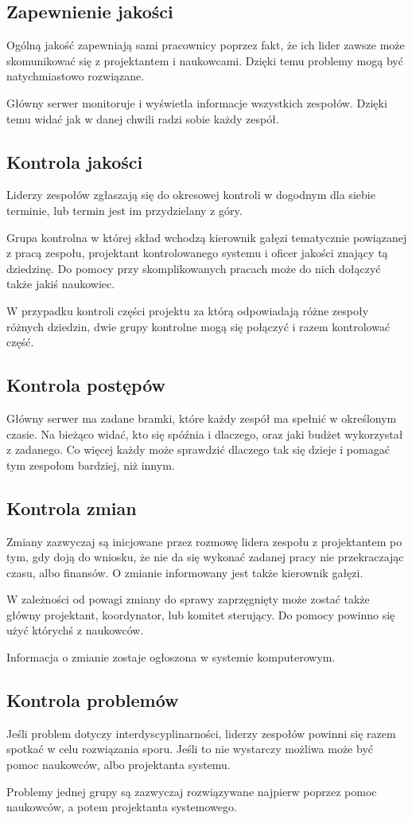 \subsection{Zapewnienie jakości}
Ogólną jakość zapewniają sami pracownicy poprzez fakt, że ich lider zawsze może skomunikować się z projektantem i naukowcami.
Dzięki temu problemy mogą być natychmiastowo rozwiązane.

Główny serwer monitoruje i wyświetla informacje wszystkich zespołów.
Dzięki temu widać jak w danej chwili radzi sobie każdy zespół.

\subsection{Kontrola jakości}
Liderzy zespołów zgłaszają się do okresowej kontroli w dogodnym dla siebie terminie, lub termin jest im przydzielany z góry.

Grupa kontrolna w której skład wchodzą kierownik gałęzi tematycznie powiązanej z pracą zespołu, projektant kontrolowanego systemu i oficer jakości znający tą dziedzinę.
Do pomocy przy skomplikowanych pracach może do nich dołączyć także jakiś naukowiec.

W przypadku kontroli części projektu za którą odpowiadają różne zespoły różnych dziedzin, dwie grupy kontrolne mogą się połączyć i razem kontrolować część.

\subsection{Kontrola postępów}
Główny serwer ma zadane bramki, które każdy zespół ma spełnić w określonym czasie. Na bieżąco widać, kto się spóźnia i dlaczego, oraz jaki budżet wykorzystał z zadanego.
Co więcej każdy może sprawdzić dlaczego tak się dzieje i pomagać tym zespołom bardziej, niż innym.

\subsection{Kontrola zmian}
Zmiany zazwyczaj są inicjowane przez rozmowę lidera zespołu z projektantem po tym, gdy doją do wniosku, że nie da się wykonać zadanej pracy nie przekraczając czasu, albo finansów.
O zmianie informowany jest także kierownik gałęzi.

W zależności od powagi zmiany do sprawy zaprzęgnięty może zostać także główny projektant, koordynator, lub komitet sterujący.
Do pomocy powinno się użyć którychś z naukowców.

Informacja o zmianie zostaje ogłoszona w systemie komputerowym.

\subsection{Kontrola problemów}
Jeśli problem dotyczy interdyscyplinarności, liderzy zespołów powinni się razem spotkać w celu rozwiązania sporu.
Jeśli to nie wystarczy możliwa może być pomoc naukowców, albo projektanta systemu.

Problemy jednej grupy są zazwyczaj rozwiązywane najpierw poprzez pomoc naukowców, a potem projektanta systemowego.


